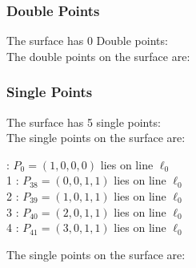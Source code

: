 \documentclass{article}
\begin{document}
{\subsubsection*{Double Points}
The surface has 0 Double points:\\
The double points on the surface are:\\
\begin{multicols}{2}
\noindent
\end{multicols}
\subsubsection*{Single Points}
The surface has 5 single points:\\
The single points on the surface are:\\
\begin{multicols}{2}
 : $P_{0}=( 1, 0, 0, 0 )$ lies on line $\ell_{0}$\\
1 : $P_{38}=( 0, 0, 1, 1 )$ lies on line $\ell_{0}$\\
2 : $P_{39}=( 1, 0, 1, 1 )$ lies on line $\ell_{0}$\\
3 : $P_{40}=( 2, 0, 1, 1 )$ lies on line $\ell_{0}$\\
4 : $P_{41}=( 3, 0, 1, 1 )$ lies on line $\ell_{0}$\\
\end{multicols}
The single points on the surface are:\\
}
\end{document}
